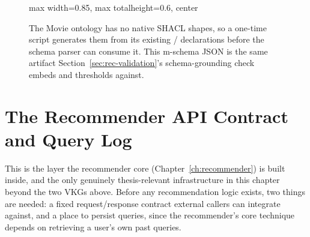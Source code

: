 \begin{figure}[H]
\centering
\begin{adjustbox}{max width=0.85\textwidth, max totalheight=0.6\textheight, center}
\end{adjustbox}
\caption{The Movie ontology has no native SHACL shapes, so a one-time script generates them from
its existing / declarations before the schema parser can consume
it. This m-schema JSON is the same artifact Section~\ref{sec:rec-validation}'s schema-grounding
check embeds and thresholds against.}
\label{fig:arch-shacl}
\end{figure}

\section{The Recommender API Contract and Query Log}
\label{sec:arch-api}

This is the layer the recommender core (Chapter~\ref{ch:recommender}) is built inside, and the
only genuinely thesis-relevant infrastructure in this chapter beyond the two VKGs above. Before any
recommendation logic exists, two things are needed: a fixed request/response contract external
callers can integrate against, and a place to persist queries, since the recommender's core
technique depends on retrieving a user's own past queries.

